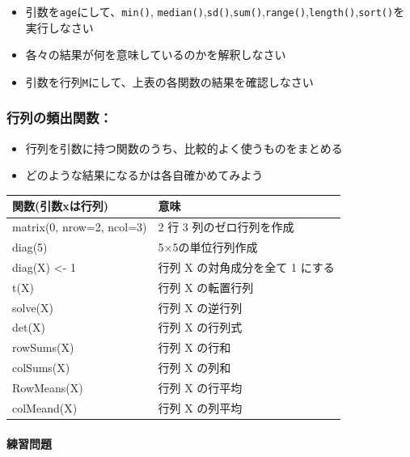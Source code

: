 \documentclass[
]{book}
\providecommand{\tightlist}{%
  \setlength{\itemsep}{0pt}\setlength{\parskip}{0pt}}
\begin{document}
\begin{itemize}
\tightlist
\item
  引数を\texttt{age}にして、\texttt{min()}, \texttt{median()},\texttt{sd()},\texttt{sum()},\texttt{range()},\texttt{length()},\texttt{sort()}を実行しなさい\\
\item
  各々の結果が何を意味しているのかを解釈しなさい\\
\item
  引数を行列\texttt{M}にして、上表の各関数の結果を確認しなさい
\end{itemize}

\hypertarget{ux884cux5217ux306eux983bux51faux95a2ux6570}{%
\subsubsection*{行列の頻出関数：}\label{ux884cux5217ux306eux983bux51faux95a2ux6570}}

\begin{itemize}
\tightlist
\item
  行列を引数に持つ関数のうち、比較的よく使うものをまとめる
\item
  どのような結果になるかは各自確かめてみよう
\end{itemize}

\begin{longtable}[]{@{}ll@{}}
\toprule\noalign{}
関数(引数xは行列) & 意味 \\
\midrule\noalign{}
\endhead
\bottomrule\noalign{}
\endlastfoot
matrix(0, nrow=2, ncol=3) & 2 行 3 列のゼロ行列を作成 \\
diag(5) & 5×5の単位行列作成 \\
diag(X) \textless- 1 & 行列 X の対角成分を全て 1 にする \\
t(X) & 行列 X の転置行列 \\
solve(X) & 行列 X の逆行列 \\
det(X) & 行列 X の行列式 \\
rowSums(X) & 行列 X の行和 \\
colSums(X) & 行列 X の列和 \\
RowMeans(X) & 行列 X の行平均 \\
colMeand(X) & 行列 X の列平均 \\
\end{longtable}

\hypertarget{ux7df4ux7fd2ux554fux984c-5}{%
\paragraph*{練習問題}\label{ux7df4ux7fd2ux554fux984c-5}}
\end{document}
